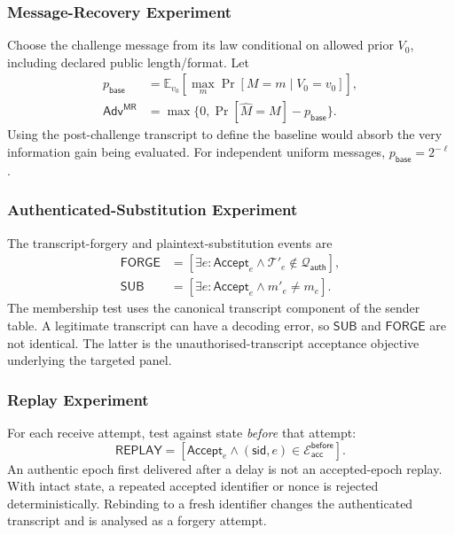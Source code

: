 \documentclass[journal]{IEEEtran}
\theoremstyle{definition}
\theoremstyle{game}
\begin{document}
\subsubsection{Message-Recovery Experiment}
Choose the challenge message from its law conditional on allowed prior
$V_0$, including declared public length/format. Let
\begin{align}
p_{\mathsf{base}}&=\mathbb E_{v_0}[\max_m\Pr[M=m\mid V_0=v_0]],\\
\mathsf{Adv}^{\mathsf{MR}}&=
\max\{0,\Pr[\widehat M=M]-p_{\mathsf{base}}\}.
\end{align}
Using the post-challenge transcript to define the baseline would absorb the
very information gain being evaluated. For independent uniform messages,
$p_{\mathsf{base}}=2^{-\ell}$.

\subsubsection{Authenticated-Substitution Experiment}
The transcript-forgery and plaintext-substitution events are
\begin{align}
\mathsf{FORGE}&=[\exists e:\mathsf{Accept}_e\wedge
\mathcal T'_e\notin\mathcal Q_{\mathsf{auth}}],\\
\mathsf{SUB}&=[\exists e:\mathsf{Accept}_e\wedge m'_e\ne m_e].
\end{align}
The membership test uses the canonical transcript component of the
sender table. A legitimate transcript can have a decoding error, so
$\mathsf{SUB}$ and $\mathsf{FORGE}$ are not identical. The latter is the
unauthorised-transcript acceptance objective underlying the targeted panel.

\subsubsection{Replay Experiment}
For each receive attempt, test against state \emph{before} that attempt:
\[
\mathsf{REPLAY}=[\mathsf{Accept}_e\wedge
(\mathsf{sid},e)\in\mathcal E_{\mathsf{acc}}^{\mathsf{before}}].
\]
An authentic epoch first delivered after a delay is not an accepted-epoch
replay. With intact state, a repeated accepted identifier or nonce is
rejected deterministically. Rebinding to a fresh identifier changes the
authenticated transcript and is analysed as a forgery attempt.
\end{document}
